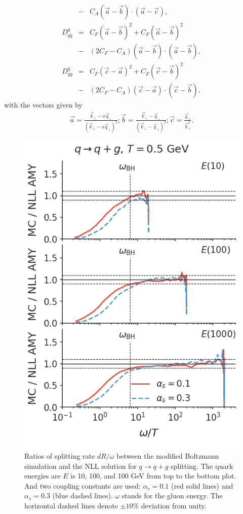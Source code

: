 \documentclass[aps, prc, reprint, amsmath, groupedaddress, nofootinbib]{revtex4-1}
\begin{document}
\begin{appendices}
\begin{eqnarray}
&-& C_A (\vec{a}-\vec{b})\cdot (\vec{a}-\vec{c}),
\\
D_{q\bar{q}}^{g} &=& 
C_F(\vec{a}-\vec{b})^2 + C_F(\vec{a}-\vec{b})^2 \\\nonumber
&-& (2C_F-C_A) (\vec{a}-\vec{b})\cdot (\vec{a}-\vec{b}),
\\
D_{qg}^{q} &=& 
C_F(\vec{c}-\vec{a})^2 + C_F(\vec{c}-\vec{b})^2 \\\nonumber
&-& (2C_F-C_A) (\vec{c}-\vec{a})\cdot (\vec{c}-\vec{b}),
\end{eqnarray}
with the vectors given by
\begin{eqnarray}
\vec{a} = \frac{\vec{k}_\perp - x\vec{q}_\perp}{(\vec{k}_\perp - x\vec{q}_\perp)^2};
\vec{b} = \frac{\vec{k}_\perp - \vec{q}_\perp}{(\vec{k}_\perp - \vec{q}_\perp)^2};
\vec{c} =  \frac{\vec{k}_\perp}{\vec{k}_\perp^2}.
\end{eqnarray}

\begin{figure}
\includegraphics[width=\columnwidth]{spectrum_E_q2qg.png}
\caption{Ratios of splitting rate $dR/\omega$ between the modified Boltzmann simulation and the NLL solution for $q\rightarrow q+g$ splitting. The quark energies are $E$ is 10, 100, and 100 GeV from top to the bottom plot. 
And two coupling constants are used: $\alpha_s = 0.1$ (red solid lines) and $\alpha_s = 0.3$ (blue dashed lines).
$\omega$ stands for the gluon energy.
The horizontal dashed lines denote $\pm 10\%$ deviation from unity. }
\label{fig:q2qg}
\end{figure}


\end{appendices}
\end{document}
